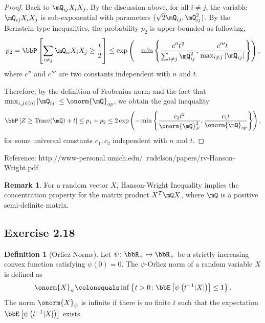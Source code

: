 \documentclass[11pt]{article}
\DeclareMathOperator{\tr}{Trace}
\newcommand{\of}[1]{\left(#1\right)}
\newcommand{\off}[1]{\left[#1\right]}
\newcommand{\offf}[1]{\left\{#1\right\}}
\theoremstyle{plain}
\theoremstyle{definition}
\newtheorem{defn}{Definition}
\newtheorem{rmk}{Remark}
\begin{document}
\begin{proof}
    	\vspace{0.2cm}
    	Back to $\mQ_{ij} X_i X_j$. By the discussion above, for all $i\neq j$, the variable $\mQ_{ij} X_i X_j$ is sub-exponential with parameters $(\sqrt{2} \mQ_{ij}, \mQ_{ij}^2)$. By the Bernstein-type inequalities, the probability $p_2$ is upper bounded as following,
    	\begin{equation}
    		p_2 = \bbP \off{ \sum_{i \neq j} \mQ_{ii} X_i X_j  \geq \frac{t}{2}} \leq \exp \of{ - \min \offf{  \frac{c'' t^2}{\sum_{i\neq j} \mQ^2_{ij} }, \frac{c'''t}{\max_{i\neq j   }|\mQ_{ij}| } }},
    	\end{equation}
    	where $c''$ and $c'''$ are two constants independent with $n$ and $t$.
    	
    	\vspace{0.2cm}
    	
    	Therefore, by the definition of Frobenius norm and the fact that $\max_{i,j\in[n]}|\mQ_{ij}| \leq \onorm{\mQ}_{op} $, we obtain the goal inequality
    	\begin{equation}
    		\bbP \off{ Z \geq \tr(\mQ) +  t } \leq p_1 + p_2 \leq 2\exp \of{ - \min \offf{  \frac{c_2 t^2}{\onorm{\mQ}^2_F}, \frac{c_1t}{\onorm{\mQ}_{op} }} },
    	\end{equation}
    	for some universal constants $c_1,c_2$ independent with $n$ and $t$.
    \end{proof}
    
    Reference: http://www-personal.umich.edu/~rudelson/papers/rv-Hanson-Wright.pdf.
    
    \begin{rmk}
    	For a random vector $X$, Hanson-Wright Inequality implies the concentration property for the matrix product $X^T \mQ X$, where $\mQ$ is a positive semi-definite matrix.
    \end{rmk}
    
    
    \subsection{Exercise 2.18}
    
    \begin{defn}[Orlicz Norms]\label{def:orlicz}
     Let $\psi \colon \bbR_+ \mapsto \bbR_+$ be a strictly increasing convex function satisfying $\psi(0) = 0$. The $\psi$-Orlicz norm of a random variable $X$ is defined as
    \begin{equation}
    	\onorm{X}_{\psi} \colonequals \inf \offf{t > 0\colon \bbE\off{\psi \of{t^{-1} |X| } } \leq 1  }.
    \end{equation}
    The norm $\onorm{X}_{\psi}$ is infinite if there is no finite $t$ such that the expectation $ \bbE\off{\psi \of{t^{-1} |X| } }$ exists.
    \end{defn}
    
\end{document}
